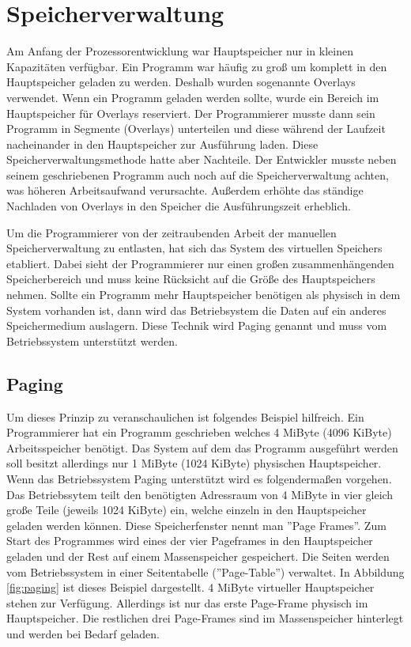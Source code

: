 \documentclass[12pt]{article}
\begin{document}
\section{Speicherverwaltung}
Am Anfang der Prozessorentwicklung war Hauptspeicher nur in kleinen Kapazitäten verfügbar. Ein Programm war häufig zu groß um komplett in den Hauptspeicher geladen zu werden. Deshalb wurden sogenannte Overlays verwendet. Wenn ein Programm geladen werden sollte, wurde ein Bereich im Hauptspeicher für Overlays reserviert. Der Programmierer musste dann sein Programm in Segmente (Overlays) unterteilen und diese während der Laufzeit nacheinander in den Hauptspeicher zur Ausführung laden. Diese Speicherverwaltungsmethode hatte aber Nachteile. Der Entwickler musste neben seinem geschriebenen Programm auch noch auf die Speicherverwaltung achten, was höheren Arbeitsaufwand verursachte. Außerdem erhöhte das ständige Nachladen von Overlays in den Speicher die Ausführungszeit erheblich. \cite[S.173]{mikroprozessortechnik2011}


Um die Programmierer von der zeitraubenden Arbeit der manuellen Speicherverwaltung zu entlasten, hat sich das System des virtuellen Speichers etabliert. Dabei sieht der Programmierer nur einen großen zusammenhängenden Speicherbereich und muss keine Rücksicht auf die Größe des Hauptspeichers nehmen. Sollte ein Programm mehr Hauptspeicher benötigen als physisch in dem System vorhanden ist, dann wird das Betriebsystem die Daten auf ein anderes Speichermedium auslagern. Diese Technik wird Paging genannt und muss vom Betriebssystem unterstützt werden.

\subsection{Paging}
Um dieses Prinzip zu veranschaulichen ist folgendes Beispiel hilfreich. Ein Programmierer hat ein Programm geschrieben welches 4 MiByte (4096 KiByte) Arbeitsspeicher benötigt. Das System auf dem das Programm ausgeführt werden soll besitzt allerdings nur 1 MiByte (1024 KiByte) physischen Hauptspeicher. Wenn das Betriebssystem Paging unterstützt wird es folgendermaßen vorgehen. Das Betriebssytem teilt den benötigten Adressraum von 4 MiByte in vier gleich große Teile (jeweils 1024 KiByte) ein, welche einzeln in den Hauptspeicher geladen werden können. Diese Speicherfenster nennt man ''Page Frames''. Zum Start des Programmes wird eines der vier Pageframes in den Hauptspeicher geladen und der Rest auf einem Massenspeicher gespeichert. Die Seiten werden vom Betriebssystem in einer Seitentabelle (''Page-Table'') verwaltet. \newline In Abbildung \ref{fig:paging} ist dieses Beispiel dargestellt. 4 MiByte virtueller Hauptspeicher stehen zur Verfügung. Allerdings ist nur das erste Page-Frame physisch im Hauptspeicher. Die restlichen drei Page-Frames sind im Massenspeicher hinterlegt und werden bei Bedarf geladen.
\end{document}

